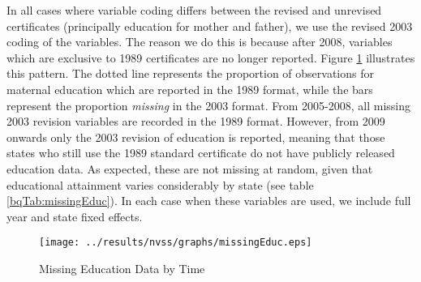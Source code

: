 \documentclass[a4paper, 11 pt]{article}
\theoremstyle{plain}
\begin{document}
\begin{spacing}{1.4}
In all cases where variable coding differs between the revised and unrevised
certificates (principally education for mother and father), we use the revised
2003 coding of the variables.  The reason we do this is because after 2008,
variables which are exclusive to 1989 certificates are no longer reported.
Figure \ref{bqFig:educMissing} illustrates this pattern.  The dotted line 
represents the proportion of observations for maternal education which are
reported in the 1989 format, while the bars represent the proportion 
\emph{missing} in the 2003 format.  From 2005-2008, all missing 2003 revision
variables are recorded in the 1989 format.  However, from 2009 onwards only
the 2003 revision of education is reported, meaning that those states who
still use the 1989 standard certificate do not have publicly released education
data.  As expected, these are not missing at random, given that educational
attainment varies considerably by state (see table \ref{bqTab:missingEduc}).
In each case when these variables are used, we include full year and state
fixed effects.  
\begin{figure}[htpb!]
\caption{Missing Education Data by Time}
\label{bqFig:educMissing}
\texttt{[image: ../results/nvss/graphs/missingEduc.eps]}
\end{figure}



\end{spacing}
\end{document}

